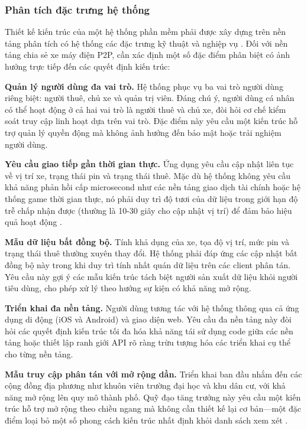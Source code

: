 \subsubsection{Phân tích đặc trưng hệ thống}

Thiết kế kiến trúc của một hệ thống phần mềm phải được xây dựng trên nền tảng phân tích có hệ thống các đặc trưng kỹ thuật và nghiệp vụ \cite{bass2021}. Đối với nền tảng chia sẻ xe máy điện P2P, cần xác định một số đặc điểm phân biệt có ảnh hưởng trực tiếp đến các quyết định kiến trúc:

\textbf{Quản lý người dùng đa vai trò.} Hệ thống phục vụ ba vai trò người dùng riêng biệt: người thuê, chủ xe và quản trị viên. Đáng chú ý, người dùng cá nhân có thể hoạt động ở cả hai vai trò là người thuê và chủ xe, đòi hỏi cơ chế kiểm soát truy cập linh hoạt dựa trên vai trò. Đặc điểm này yêu cầu một kiến trúc hỗ trợ quản lý quyền động mà không ảnh hưởng đến bảo mật hoặc trải nghiệm người dùng.

\textbf{Yêu cầu giao tiếp gần thời gian thực.} Ứng dụng yêu cầu cập nhật liên tục về vị trí xe, trạng thái pin và trạng thái thuê. Mặc dù hệ thống không yêu cầu khả năng phản hồi cấp microsecond như các nền tảng giao dịch tài chính hoặc hệ thống game thời gian thực, nó phải duy trì độ tươi của dữ liệu trong giới hạn độ trễ chấp nhận được (thường là 10-30 giây cho cập nhật vị trí) để đảm bảo hiệu quả hoạt động \cite{richards2020}.

\textbf{Mẫu dữ liệu bất đồng bộ.} Tính khả dụng của xe, tọa độ vị trí, mức pin và trạng thái thuê thường xuyên thay đổi. Hệ thống phải đáp ứng các cập nhật bất đồng bộ này trong khi duy trì tính nhất quán dữ liệu trên các client phân tán. Yêu cầu này gợi ý các mẫu kiến trúc tách biệt người sản xuất dữ liệu khỏi người tiêu dùng, cho phép xử lý theo hướng sự kiện có khả năng mở rộng.

\textbf{Triển khai đa nền tảng.} Người dùng tương tác với hệ thống thông qua cả ứng dụng di động (iOS và Android) và giao diện web. Yêu cầu đa nền tảng này đòi hỏi các quyết định kiến trúc tối đa hóa khả năng tái sử dụng code giữa các nền tảng hoặc thiết lập ranh giới API rõ ràng trừu tượng hóa các triển khai cụ thể cho từng nền tảng.

\textbf{Mẫu truy cập phân tán với mở rộng dần.} Triển khai ban đầu nhắm đến các cộng đồng địa phương như khuôn viên trường đại học và khu dân cư, với khả năng mở rộng lên quy mô thành phố. Quỹ đạo tăng trưởng này yêu cầu một kiến trúc hỗ trợ mở rộng theo chiều ngang mà không cần thiết kế lại cơ bản—một đặc điểm loại bỏ một số phong cách kiến trúc nhất định khỏi danh sách xem xét \cite{newman2021}.

